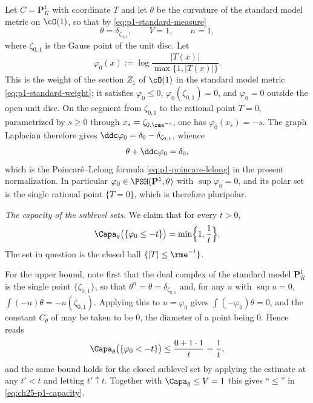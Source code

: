 \begin{example}
\label{ex:ch25-pluripolar-computed}
Let $C=\mathbf P^1_K$ with coordinate $T$ and let $\theta$ be the
curvature of the standard model metric on $\cO(1)$, so that by
\eqref{eq:p1-standard-measure}
\[
 \theta=\delta_{\zeta_{0,1}},\qquad V=1,\qquad n=1,
\]
where $\zeta_{0,1}$ is the Gauss point of the unit disc.  Let
\[
 \varphi_0(x):=\log\frac{|T(x)|}{\max\{1,|T(x)|\}} .
\]
This is the weight of the section $Z_1$ of $\cO(1)$ in the standard model
metric \eqref{eq:p1-standard-weight}; it satisfies $\varphi_0\leq0$,
$\varphi_0(\zeta_{0,1})=0$, and $\varphi_0=0$ outside the open unit disc.
On the segment from $\zeta_{0,1}$ to the rational point $T=0$,
parametrized by $s\geq0$ through $x_s=\zeta_{0,\rme^{-s}}$, one has
$\varphi_0(x_s)=-s$.  The graph Laplacian therefore gives
$\ddc\varphi_0=\delta_0-\delta_{\zeta_{0,1}}$, whence
\[
 \theta+\ddc\varphi_0=\delta_0,
\]
which is the Poincar\'e--Lelong formula \eqref{eq:p1-poincare-lelong} in the
present normalization.  In particular $\varphi_0\in\PSH(\mathbf P^1,\theta)$
with $\sup\varphi_0=0$, and its polar set is the single rational point
$\{T=0\}$, which is therefore pluripolar.

\emph{The capacity of the sublevel sets.}  We claim that for every
$t>0$,
\begin{equation}
\label{eq:ch25-p1-capacity}
 \Capa_\theta\bigl(\{\varphi_0\leq-t\}\bigr)=\min\Bigl\{1,\frac1t\Bigr\} .
\end{equation}
The set in question is the closed ball $\{|T|\leq\rme^{-t}\}$.

For the upper bound, note first that the dual complex of the standard model
$\mathbf P^1_R$ is the single point $\{\zeta_{0,1}\}$, so that
$\theta^n=\theta=\delta_{\zeta_{0,1}}$ and, for any $u$ with
$\sup u=0$, $\int(-u)\theta=-u(\zeta_{0,1})$.  Applying this to
$u=\varphi_0$ gives $\int(-\varphi_0)\theta=0$, and the constant
$C_\theta$ of  may be taken to be $0$,
the diameter of a point being $0$.  Hence
 reads
\[
 \Capa_\theta\bigl(\{\varphi_0<-t\}\bigr)\leq\frac{0+1\cdot1}{t}
 =\frac1t ,
\]
and the same bound holds for the closed sublevel set by applying the estimate
at any $t'<t$ and letting $t'\uparrow t$.  Together with
$\Capa_\theta\leq V=1$ this gives ``$\leq$'' in
\eqref{eq:ch25-p1-capacity}.


\end{example}

